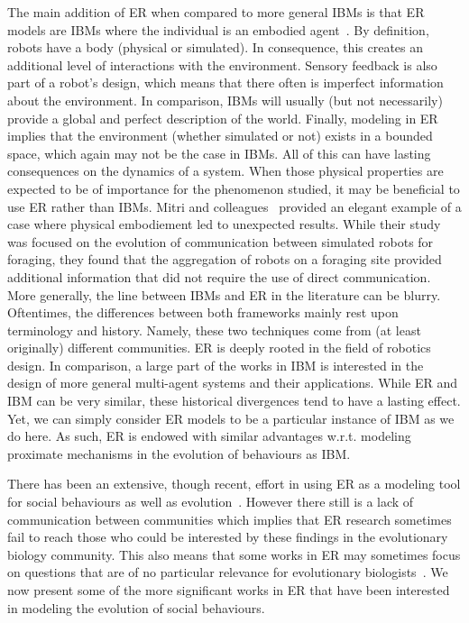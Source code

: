 

        The main addition of ER when compared to more general IBMs is that ER models are IBMs where the individual is an embodied agent~\parencite{Mitri2013}. By definition, robots have a body (physical or simulated). In consequence, this creates an additional level of interactions with the environment. Sensory feedback is also part of a robot's design, which means that there often is imperfect information about the environment. In comparison, IBMs will usually (but not necessarily) provide a global and perfect description of the world. Finally, modeling in ER implies that the environment (whether simulated or not) exists in a bounded space, which again may not be the case in IBMs. All of this can have lasting consequences on the dynamics of a system. When those physical properties are expected to be of importance for the phenomenon studied, it may be beneficial to use ER rather than IBMs. Mitri and colleagues~\parencite{Mitri2009} provided an elegant example of a case where physical embodiement led to unexpected results. While their study was focused on the evolution of communication between simulated robots for foraging, they found that the aggregation of robots on a foraging site provided additional information that did not require the use of direct communication. More generally, the line between IBMs and ER in the literature can be blurry. Oftentimes, the differences between both frameworks mainly rest upon terminology and history. Namely, these two techniques come from (at least originally) different communities. ER is deeply rooted in the field of robotics design. In comparison, a large part of the works in IBM is interested in the design of more general multi-agent systems and their applications. While ER and IBM can be very similar, these historical divergences tend to have a lasting effect. Yet, we can simply consider ER models to be a particular instance of IBM as we do here. As such, ER is endowed with similar advantages w.r.t. modeling proximate mechanisms in the evolution of behaviours as IBM.

        There has been an extensive, though recent, effort in using ER as a modeling tool for social behaviours as well as evolution~\parencite{Mitri2013, Trianni2014b, Eiben2014, Doncieux2015a}. However there still is a lack of communication between communities which implies that ER research sometimes fail to reach those who could be interested by these findings in the evolutionary biology community. This also means that some works in ER may sometimes focus on questions that are of no particular relevance for evolutionary biologists~\parencite{Trianni2014b, Doncieux2015a}. We now present some of the more significant works in ER that have been interested in modeling the evolution of social behaviours. 

